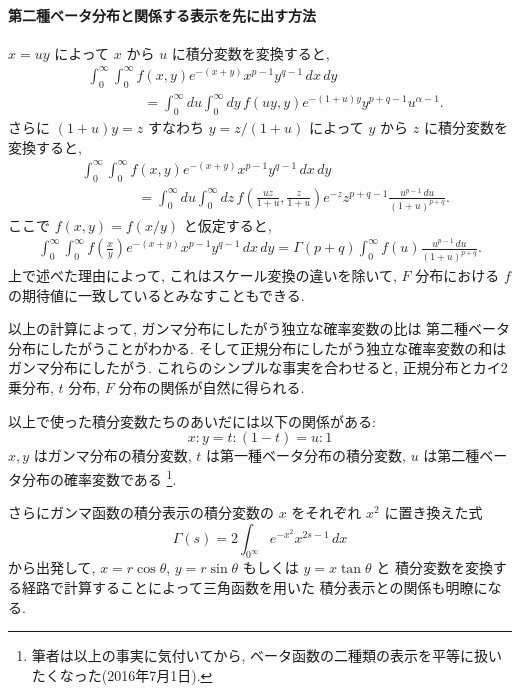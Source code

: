 \documentclass[12pt,twoside]{jarticle}
\theoremstyle{jplain}
\theoremstyle{jplain}
\theoremstyle{jplain}
\numberwithin{theorem}{section}
\numberwithin{equation}{section}
\numberwithin{figure}{section}
\numberwithin{table}{section}
\begin{document}
\paragraph{第二種ベータ分布と関係する表示を先に出す方法}
$x=uy$ によって $x$ から $u$ に積分変数を変換すると,
\begin{align*}
&
\int_0^\infty\int_0^\infty f(x,y)e^{-(x+y)}x^{p-1}y^{q-1}\,dx\,dy
\\ & \qquad\qquad
=\int_0^\infty du \int_0^\infty dy\, f(uy,y) e^{-(1+u)y}y^{p+q-1}u^{\alpha-1}.
\end{align*}
さらに $(1+u)y=z$ すなわち $y=z/(1+u)$ によって $y$ から $z$ に積分変数を変換すると, 
\begin{align*}
&
\int_0^\infty\int_0^\infty f(x,y)e^{-(x+y)}x^{p-1}y^{q-1}\,dx\,dy
\\ & \qquad\qquad
=\int_0^\infty du \int_0^\infty dz\, 
f\left(\frac{uz}{1+u},\frac{z}{1+u}\right) e^{-z}z^{p+q-1} \frac{u^{p-1}\,du}{(1+u)^{p+q}}.
\end{align*}
ここで $f(x,y)=f(x/y)$ と仮定すると, 
\begin{align*}
\int_0^\infty\int_0^\infty f\left(\frac{x}{y}\right)e^{-(x+y)}x^{p-1}y^{q-1}\,dx\,dy
=\Gamma(p+q)\int_0^\infty f(u)\frac{u^{p-1}\,du}{(1+u)^{p+q}}.
\end{align*}
上で述べた理由によって, これはスケール変換の違いを除いて, 
$F$ 分布における $f$ の期待値に一致しているとみなすこともできる.


以上の計算によって, ガンマ分布にしたがう独立な確率変数の比は
第二種ベータ分布にしたがうことがわかる.
そして正規分布にしたがう独立な確率変数の和はガンマ分布にしたがう.
これらのシンプルな事実を合わせると, 
正規分布とカイ2乗分布, $t$ 分布, $F$ 分布の関係が自然に得られる.

以上で使った積分変数たちのあいだには以下の関係がある:
\[
x:y = t:(1-t) = u:1
\]
$x,y$ はガンマ分布の積分変数, $t$ は第一種ベータ分布の積分変数, 
$u$ は第二種ベータ分布の確率変数である%
\footnote{筆者は以上の事実に気付いてから, 
ベータ函数の二種類の表示を平等に扱いたくなった(2016年7月1日).}.

さらにガンマ函数の積分表示の積分変数の $x$ をそれぞれ $x^2$ に置き換えた式
\[
\Gamma(s)=2\int_{0^\infty} e^{-x^2}x^{2s-1}\,dx
\]
から出発して, $x=r\cos\theta$, $y=r\sin\theta$ もしくは $y=x\tan\theta$ と
積分変数を変換する経路で計算することによって三角函数を用いた
積分表示との関係も明瞭になる.
\end{document}
